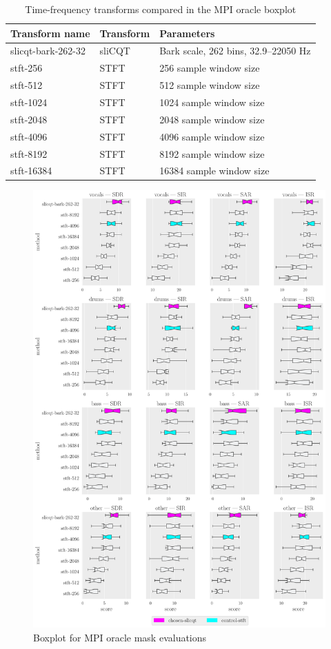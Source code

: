 \documentclass[report.tex]{subfiles}
\begin{document}
\begin{table}[ht]
	\centering
	\caption{Time-frequency transforms compared in the MPI oracle boxplot}
	\label{table:winsizes}
	\begin{tabular}{ |l|l|l| }
	 \hline
		Transform name & Transform & Parameters \\
	 \hline
	 \hline
		slicqt-bark-262-32 & sliCQT & Bark scale, 262 bins, 32.9--22050 Hz \\
	 \hline
		stft-256 & STFT & 256 sample window size \\
	 \hline
		stft-512 & STFT & 512 sample window size \\
	 \hline
		stft-1024 & STFT & 1024 sample window size \\
	 \hline
		stft-2048 & STFT & 2048 sample window size \\
	 \hline
		stft-4096 & STFT & 4096 sample window size \\
	 \hline
		stft-8192 & STFT & 8192 sample window size \\
	 \hline
		stft-16384 & STFT & 16384 sample window size \\
	 \hline
\end{tabular}
\end{table}

\begin{figure}[ht]
	\centering
	\includegraphics[width=\textwidth]{./images-bss/oracle_boxplot.pdf}
	\caption{Boxplot for MPI oracle mask evaluations}
	\label{fig:oraclebssboxplot}
\end{figure}
\end{document}
